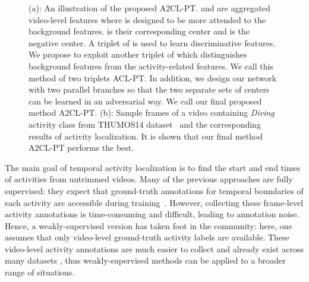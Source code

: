 \documentclass[runningheads]{llncs}
\newcommand{\thumos}{\mbox{THUMOS14}}
\newcommand{\ourlossname}{\mbox{A2CL-PT}}
\newcommand{\intlossname}{\mbox{ACL-PT}}
\begin{document}
\begin{figure}[t]
  \adjustbox{valign=t}{\begin{minipage}[t]{0.42\linewidth}
  \small
    \texttt{[image: 1a.PNG]}\-0.5ex] \hspace*{10.1em}(b)
  \end{minipage}}
  \caption{(a): An illustration of the proposed \ourlossname{}.  and  are aggregated video-level features where  is designed to be more attended to the background features.  is their corresponding center and  is the negative center. A triplet of  is used to learn discriminative features. We propose to exploit another triplet of  which distinguishes background features from the activity-related features. We call this method of two triplets \intlossname{}. In addition, we design our network with two parallel branches so that the two separate sets of centers can be learned in an adversarial way. We call our final proposed method \ourlossname{}. (b): Sample frames of a video containing \textit{Diving} activity class from \thumos{} dataset~\cite{THUMOS14} and the corresponding results of activity localization. It is shown that our final method \ourlossname{} performs the best.}
  \label{fig1}
\end{figure}

The main goal of temporal activity localization is to find the start and end times of activities from untrimmed videos. Many of the previous approaches are fully supervised: they expect that ground-truth annotations for temporal boundaries of each activity are accessible during training~\cite{shou2016temporal,shou2017cdc,xu2017r,zhao2017temporal,chao2018rethinking,lin2018bsn,long2019gaussian}. However, collecting these frame-level activity annotations is time-consuming and difficult, leading to annotation noise. Hence, a weakly-supervised version has taken foot in the community: here, one assumes that only video-level ground-truth activity labels are available. These video-level activity annotations are much easier to collect and already exist across many datasets \cite{kuehne2011hmdb,soomro2012ucf101,kay2017kinetics,monfortmoments,zhao2019hacs}, thus weakly-supervised methods can be applied to a broader range of situations.
\end{document}
